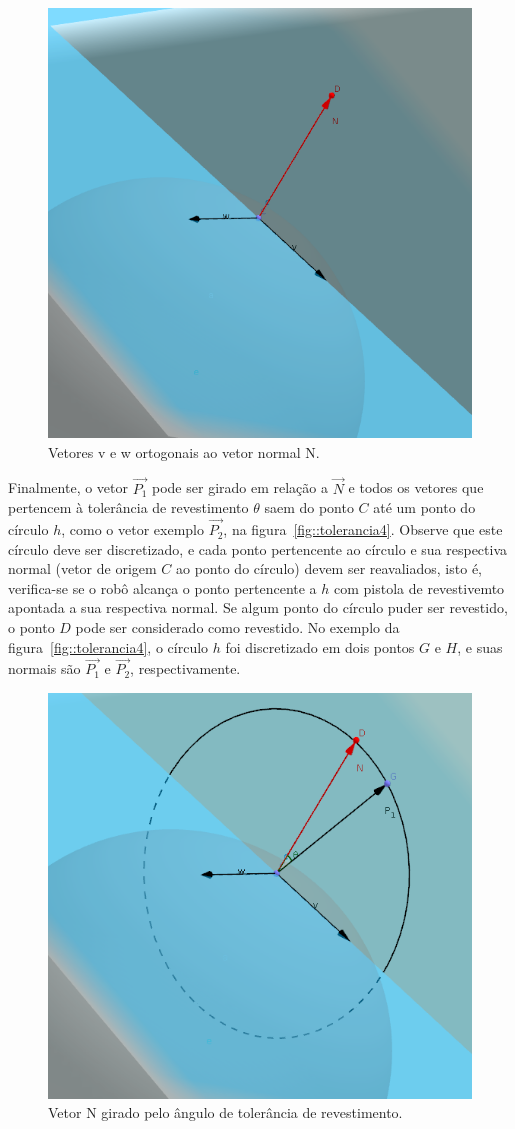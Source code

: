 \begin{figure}[h!]	
	\centering
	\includegraphics[width=0.6\columnwidth]{detail/figs/bighatch/tolerancia2.png}
	\caption{Vetores v e w ortogonais ao vetor normal N.}
	\label{fig::tolerancia2}
\end{figure}

Finalmente, o vetor $\overrightarrow{P_1}$ pode ser girado em relação a
$\overrightarrow{N}$ e todos os vetores que pertencem à tolerância de
revestimento $\theta$ saem do ponto $C$ até um ponto do círculo $h$, como o
vetor exemplo $\overrightarrow{P_2}$, na figura~\ref{fig::tolerancia4}. Observe
que este círculo deve ser discretizado, e cada ponto pertencente ao círculo e sua
respectiva normal (vetor de origem $C$ ao ponto do círculo) devem ser
reavaliados, isto é, verifica-se se o robô alcança o ponto pertencente a $h$ com
pistola de revestivemto apontada a sua respectiva normal.
Se algum ponto do círculo puder ser revestido, o ponto $D$ pode ser considerado
como revestido. No exemplo da figura~\ref{fig::tolerancia4}, o círculo $h$ foi
discretizado em dois pontos $G$ e $H$, e suas normais são $\overrightarrow{P_1}$
e $\overrightarrow{P_2}$, respectivamente. 

\begin{figure}[h!]	
	\centering
	\includegraphics[width=0.6\columnwidth]{detail/figs/bighatch/tolerancia3.png}
	\caption{Vetor N girado pelo ângulo de tolerância de revestimento.}
	\label{fig::tolerancia3}
\end{figure}

